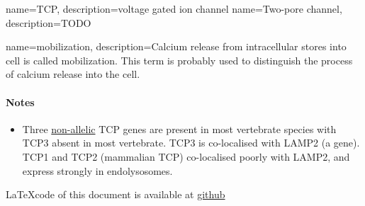 \documentclass[twocolumn]{article}
\begin{document}
    


{
    name=TCP,
    description={voltage gated ion channel}
}
{
    name=Two-pore channel,
    description={TODO}
}

{
    name=mobilization,
    description={Calcium release from intracellular stores into cell is called
        mobilization. This term is probably used to distinguish the process of
        calcium release into the cell.}
}

\paragraph{Notes}

\begin{itemize}[noitemsep,nolistsep]
    \item Three
        \href{http://biology.stackexchange.com/questions/10632/whats-a-non-allelic-gene}{non-allelic}
        TCP genes are present in most vertebrate species with TCP3 absent in
        most vertebrate. TCP3 is co-localised with LAMP2 (a gene). TCP1 and TCP2
        (mammalian TCP) co-localised poorly with LAMP2, and express strongly in
        endolysosomes.
\end{itemize}

\printglossary

{\LaTeX code of this document is available at
\href{http://github.com/dilawar/courses/raw/master/Signalling2016/Assignment02/assignment2.tex}{github}}
\end{document}

